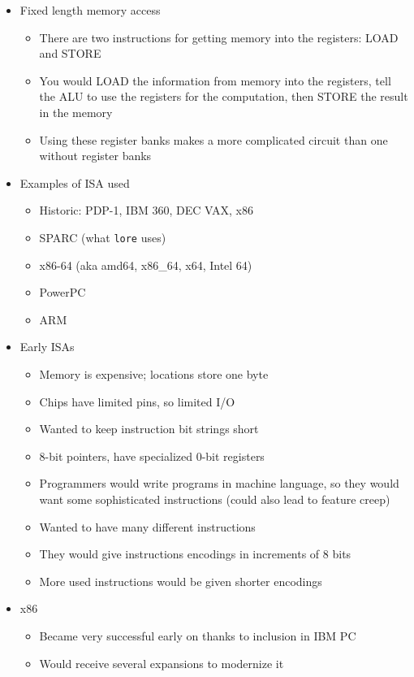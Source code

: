 \documentclass{article}
\begin{document}
\begin{itemize}
\begin{itemize}
		\end{itemize}
	\item Fixed length memory access
		\begin{itemize}
			\item There are two instructions for getting memory into the registers: LOAD and STORE
			\item You would LOAD the information from memory into the registers, tell the ALU to use the registers for the computation, then STORE the result in the memory
			\item Using these register banks makes a more complicated circuit than one without register banks
		\end{itemize}
	\item Examples of ISA used
		\begin{itemize}
			\item Historic: PDP-1, IBM 360, DEC VAX, x86
			\item SPARC (what \verb|lore| uses)
			\item x86-64 (aka amd64, x86\_64, x64, Intel 64)
			\item PowerPC
			\item ARM
		\end{itemize}
	\item Early ISAs
		\begin{itemize}
			\item Memory is expensive; locations store one byte
			\item Chips have limited pins, so limited I/O
			\item Wanted to keep instruction bit strings short
			\item 8-bit pointers, have specialized 0-bit registers
			\item Programmers would write programs in machine language, so they would want some sophisticated instructions (could also lead to feature creep)
			\item Wanted to have many different instructions
			\item They would give instructions encodings in increments of 8 bits
			\item More used instructions would be given shorter encodings
		\end{itemize}
	\item x86
		\begin{itemize}
			\item Became very successful early on thanks to inclusion in IBM PC
			\item Would receive several expansions to modernize it

\end{itemize}
\end{itemize}
\end{document}
